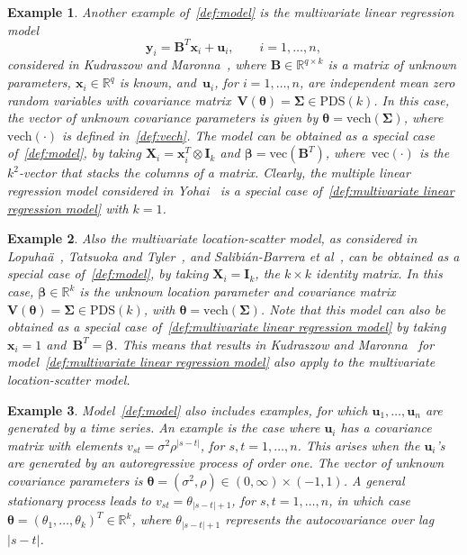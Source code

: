 \documentclass{article}
\numberwithin{equation}{section}
\theoremstyle{plain}
\newtheorem{example}{Example}
\newcommand{\R}{\mathbb{R}}
\newcommand{\vc}{\mathrm{vec}}
\newcommand{\vch}{\mathrm{vech}}
\newcommand{\bbeta}{\bm\beta}
\newcommand{\btheta}{\bm\theta}
\newcommand{\bSigma}{\mathbf{\Sigma}}
\newcommand{\by}{\mathbf{y}}
\newcommand{\bx}{\mathbf{x}}
\newcommand{\bu}{\mathbf{u}}
\newcommand{\bX}{\mathbf{X}}
\newcommand{\bV}{\mathbf{V}}
\newcommand{\bI}{\mathbf{I}}
\newcommand{\bB}{\mathbf{B}}
\begin{document}
\begin{example}
\label{ex:multivariate linear regression}
Another example of~\eqref{def:model} is the multivariate linear regression model
\begin{equation}
\label{def:multivariate linear regression model}
\by_i=\bB^T\bx_i+\bu_i,
\qquad
i=1,\ldots,n,
\end{equation}
considered in Kudraszow and Maronna~\cite{kudraszow-maronna2011}, where $\bB\in\R^{q\times k}$ is a matrix of unknown parameters, 
$\bx_i\in\R^q$ is known,
and~$\mathbf{u}_i$, for $i=1,\ldots,n$, are independent mean zero random variables with
covariance matrix~$\bV(\btheta)=\bSigma\in\text{PDS}(k)$.
In this case, the vector of unknown covariance parameters is given  by
$\btheta=\vch(\bSigma)$, where $\vch(\cdot)$ is defined in~\eqref{def:vech}.
The model can be obtained as a special case of~\eqref{def:model}, by taking
$\bX_i=\bx_i^T\otimes \bI_k$ and $\bbeta=\vc(\bB^T)$, where~$\vc(\cdot)$ is the~$k^2$-vector that stacks the columns of a matrix.
Clearly, the multiple linear regression model considered in Yohai~\cite{yohai1987} is a special case 
of~\eqref{def:multivariate linear regression model} with $k=1$.
\end{example}

\begin{example}
\label{ex:multivariate location-scatter}
Also the multivariate location-scatter model, as considered in Lopuha\"a~\cite{lopuhaa1992highly},
Tatsuoka and Tyler~\cite{tatsuoka&tyler2000}, and
Salibi\'an-Barrera \textit{et al}~\cite{SalibianBarrera-VanAelst-Willems2006},
can be obtained as a special case of~\eqref{def:model},
by taking $\bX_i=\bI_k$, the $k\times k$ identity matrix.
In this case, $\bbeta\in\R^k$ is the unknown location parameter and covariance matrix
$\bV(\btheta)=\bSigma\in\text{PDS}(k)$, with $\btheta=\vch(\bSigma)$.
Note that this model can also be obtained as a special case of~\eqref{def:multivariate linear regression model}
by taking $\bx_i=1$ and~$\bB^T=\bbeta$.
This means that results in Kudraszow and Maronna~\cite{kudraszow-maronna2011} for model~\eqref{def:multivariate linear regression model}
also apply to the multivariate location-scatter model.
\end{example}

\begin{example}
\label{ex:time series}
Model~\eqref{def:model} also includes examples, for which $\bu_1,\ldots,\bu_n$ are generated by a time series.
An example is the case where $\bu_i$ has a covariance matrix with elements
$v_{st}=\sigma^2\rho^{|s-t|}$,
for $s,t=1,\ldots,n$.
This arises when the $\bu_i$'s are generated by an autoregressive process of order one.
The vector of unknown covariance parameters is $\btheta=(\sigma^2,\rho)\in(0,\infty)\times(-1,1)$.
A general stationary process leads to
$v_{st}=\theta_{|s-t|+1}$,
for $s,t=1,\ldots,n$,
in which case $\btheta=(\theta_1,\ldots,\theta_k)^T\in\R^k$,
where $\theta_{|s-t|+1}$ represents the autocovariance over lag~$|s-t|$.
\end{example}
\end{document}
